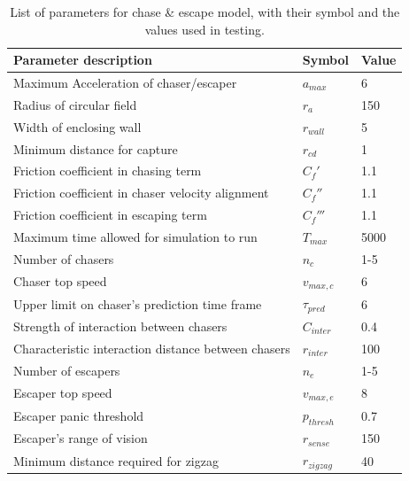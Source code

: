 \documentclass[%
11pt,
amsmath, amssymb,
aps,
pra
]{revtex4-2}
\begin{document}
\begin{table}[tb]
    \begin{center}
    \setlength\extrarowheight{-3pt}
    \begin{tabularx}{\textwidth}{X p{3cm} p{3cm}}
        \hline\hline
        Parameter description & Symbol & Value \\
        \hline
        Maximum Acceleration of chaser/escaper & \(a_{max}\) & 6 \\
        Radius of circular field& \(r_a\) & 150 \\
        Width of enclosing wall  & \(r_{wall}\) & 5 \\
        Minimum distance for capture & \(r_{cd}\) & 1 \\
        Friction coefficient in chasing term & \(C_f'\) & 1.1 \\
        Friction coefficient in chaser velocity alignment & \(C_f''\) & 1.1 \\
        Friction coefficient in escaping term & \(C_f'''\) & 1.1 \\
        Maximum time allowed for simulation to run & \(T_{max}\) & 5000 \\
        \hline
        Number of chasers & \(n_c\) & 1-5 \\
        Chaser top speed & \(v_{max, c}\) & 6 \\
        Upper limit on chaser's prediction time frame & \(\tau_{pred}\) & 6 \\
        Strength of interaction between chasers & \(C_{inter}\) & 0.4 \\
        Characteristic interaction distance between chasers & \(r_{inter}\) & 100 \\
        \hline
        Number of escapers & \(n_e\) & 1-5 \\
        Escaper top speed & \(v_{max, e}\) & 8 \\
        Escaper panic threshold & \(p_{thresh}\) & 0.7 \\
        Escaper's range of vision & \(r_{sense}\) & 150 \\
        Minimum distance required for zigzag & \(r_{zigzag}\) & 40 \\
        \hline        
    \end{tabularx}
    \caption{List of parameters for chase \& escape model, with their symbol and the values used in testing.}
    \label{tab:ChaseEscape}
    \end{center}
\end{table}
\end{document}
